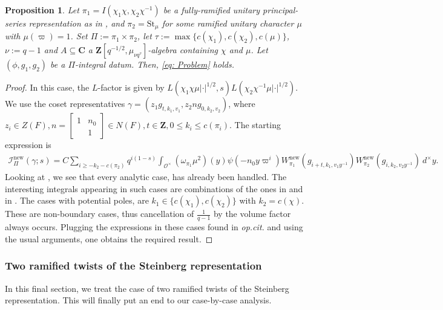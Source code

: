 \documentclass{amsart}
\theoremstyle{plain}
\newtheorem{prop}[thm]{Proposition}
\theoremstyle{plain}
\theoremstyle{remark}
\begin{document}
\begin{prop}
    Let $\pi_1=I(\chi_1\chi,\chi_2\chi^{-1})$ be a fully-ramified unitary principal-series representation as in \emph{}, and $\pi_2=\mathrm{St}_\mu$ for some ramified unitary character $\mu$ with $\mu(\varpi)=1$. Set $\Pi:=\pi_1\times\pi_2$, let $\tau:=\max\{c(\chi_1),c(\chi_2),c(\mu)\}$, $\nu:=q-1$ and $A\subseteq\mathbf{C}$ a $\mathbf{Z}[q^{-1/2},\mu_{\nu q^\tau}]$-algebra containing $\chi$ and $\mu$. Let $(\phi,g_1,g_2)$ be a $\Pi$-integral datum. Then, \eqref{eq: Problem} holds. 
\end{prop}
\begin{proof}
    In this case, the  $L$-factor is given by $L(\chi_1\chi\mu|\cdot|^{1/2},s)L(\chi_2\chi^{-1}\mu|\cdot|^{1/2})$. We use the coset representatives $\gamma=(z_1g_{t,k_1,v_1},z_2ng_{0,k_2,v_2})$, where $z_i\in Z(F),n=\left[\begin{smallmatrix}
            1 & n_0\\
            & 1
        \end{smallmatrix}\right]\in N(F),t\in\mathbf{Z}, 0\leq k_i\leq c(\pi_i)$. The starting expression is 
        \begin{align}\label{eq: 59}
            {\mathcal{I}_{\Pi}^\mathrm{new}(\gamma;s)=C\sum_{i\geq -k_2-c(\pi_2)}q^{i(1-s)}\int_{\mathcal{O}^\times}(\omega_{\pi_1}\mu^2)(y)\psi(-n_0y\varpi^i)W_{\pi_1}^\mathrm{new}(g_{i+t,k_1,v_1y^{-1}})W_{\pi_2}^\mathrm{new}(g_{i,k_2,v_2y^{-1}})\ d^\times y}.
        \end{align}
        Looking at \cite[Lemma $3.3$, Lemma $3.5$ \& Lemma  $3.6$]{Assing_2018}, we see that every analytic case, has already been handled. The interesting integrals appearing in such cases are combinations of the ones in  and in . The cases with potential poles, are $k_1\in\{c(\chi_1),c(\chi_2)\}$ with $k_2=c(\chi)$. These are non-boundary cases, thus cancellation of $\tfrac{1}{q-1}$ by the volume factor always occurs. Plugging the expressions in these cases found in \textit{op.cit.} and using the usual arguments, one obtains the required result.
\end{proof}
\subsubsection{Two ramified twists of the Steinberg representation}
In this final section, we treat the case of two ramified twists of the Steinberg representation. This will finally put an end to our case-by-case analysis.
\end{document}
